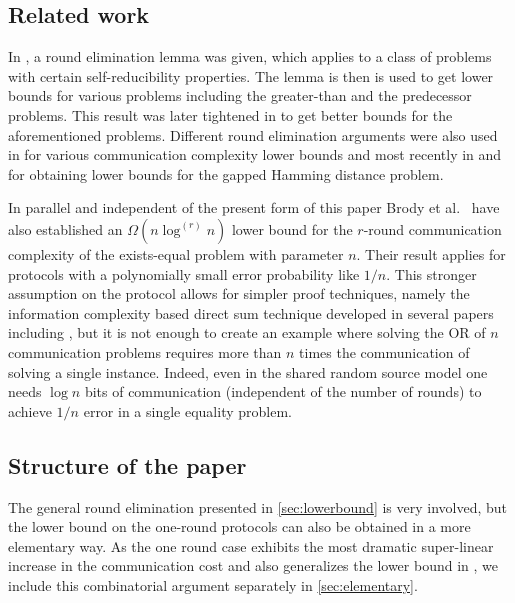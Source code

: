 \subsection{Related work}
\label{sec:intro:related}
In \cite{MiltersenNSW1998}, a round
elimination lemma was given, which applies to a class of
problems with certain self-reducibility properties. The lemma is
then is used to get lower bounds for various problems including
the greater-than and the predecessor problems. This result was
later tightened in \cite{Sen2003} to get better bounds for the
aforementioned problems. Different round elimination arguments
were also used in \cite{KarchmerW1990, HalstenbergR1988,
NisanW1993,Miltersen1994, DurisGS1987,BeameF2001} for various
communication complexity lower bounds and most recently in
\cite{BrodyC2009} and \cite{BrodyCRVW2010} for obtaining lower
bounds for the gapped Hamming distance problem.

In parallel and independent of the present form of this paper
Brody et al.\ \cite{BrodyCK2012} have also established an
$\Omega(n\log^{(r)}n)$ lower bound for the $r$-round
communication complexity of the exists-equal problem with
parameter $n$. Their result applies for protocols with a
polynomially small error probability like $1/n$. This stronger
assumption on the protocol allows for simpler proof techniques,
namely the information complexity based direct sum technique
developed in several papers including
\cite{Ablayev1996,ChakrabartiSWY2001}, but it is not enough to
create an example where solving the OR of $n$ communication
problems requires more than $n$ times the communication of
solving a single instance. Indeed, even in the shared random
source model one needs $\log n$ bits of communication
(independent of the number of rounds) to achieve $1/n$ error in
a single equality problem.

\subsection{Structure of the paper}
\label{sec:intro:map}

The general round elimination presented in
\autoref{sec:lowerbound} is very involved, but the lower bound
on the one-round protocols can also be obtained in a more
elementary way. As the one round case exhibits the most dramatic
super-linear increase in the communication cost and also
generalizes the lower bound in \cite{MolinaroWY2013}, we include
this combinatorial argument separately in
\autoref{sec:elementary}.

